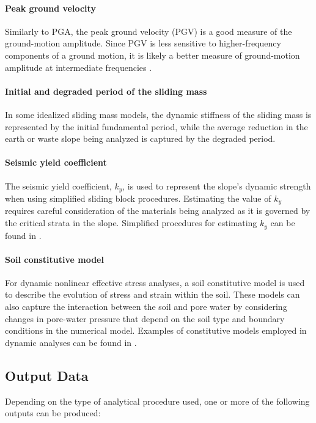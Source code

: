 \paragraph{Peak ground velocity}
Similarly to PGA, the peak ground velocity (PGV) is a good measure of the ground-motion amplitude. Since PGV is less sensitive to higher-frequency components of a ground motion, it is likely a better measure of ground-motion amplitude at intermediate frequencies \citep{kramer1996geotechnical}.

\paragraph{Initial and degraded period of the sliding mass}
In some idealized sliding mass models, the dynamic stiffness of the sliding mass is represented by the initial fundamental period, while the average reduction in the earth or waste slope being analyzed is captured by the degraded period.

\paragraph{Seismic yield coefficient}
The seismic yield coefficient, $k_y$, is used to represent the slope's dynamic strength when using simplified sliding block procedures. Estimating the value of $k_y$ requires careful consideration of the materials being analyzed as it is governed by the critical strata in the slope. Simplified procedures for estimating $k_y$ can be found in \citet{bray1998simplified}.

\paragraph{Soil constitutive model}
For dynamic nonlinear effective stress analyses, a soil constitutive model is used to describe the evolution of stress and strain within the soil. These models can also capture the interaction between the soil and pore water by considering changes in pore-water pressure that depend on the soil type and boundary conditions in the numerical model. Examples of constitutive models employed in dynamic analyses can be found in \citet{yang2003computational, byrne2004numerical, boulanger2017pm4sand, boulanger2018pm4silt}.

\subsection{Output Data}
\label{subsec:eq_landslide_output}
Depending on the type of analytical procedure used, one or more of the following outputs can be produced:

